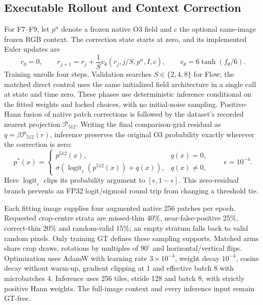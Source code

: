 \documentclass[jimaging,article,submit,pdftex,moreauthors]{Definitions/mdpi}
\begin{document}
\subsection{Executable Rollout and Context Correction}
For F7--F9, let $p^n$ denote a frozen native O3 field and $c$ the optional
same-image frozen RGB context. The correction state starts at zero, and its
implemented Euler updates are
\begin{equation}
r_0=0,\qquad
r_{j+1}=r_j+\frac{1}{S}v_\theta(r_j,j/S,p^n,I,c),\qquad
v_\theta=6\tanh\!\left(f_\theta/6\right).
\label{eq:correction-rollout}
\end{equation}
Training unrolls four steps. Validation searches $S\in\{2,4,8\}$ for Flow;
the matched direct control uses the same initialized field architecture in a
single call at state and time zero. These phases use deterministic inference
conditional on the fitted weights and locked choices, with no initial-noise
sampling. Positive-Hann fusion of native patch corrections is followed by the
dataset's recorded nearest projection $\mathcal{P}_{512}$. Writing the final
comparison-grid residual as $q=\beta\mathcal{P}_{512}(r)$, inference preserves
the original O3 probability exactly wherever the correction is zero:
\begin{equation}
p^*(x)=
\begin{cases}
p^{512}(x),&q(x)=0,\\
\sigma\!\left(\operatorname{logit}_{\epsilon}(p^{512}(x))+q(x)\right),&q(x)\ne 0,
\end{cases}
\qquad \epsilon=10^{-4}.
\label{eq:correction-output}
\end{equation}
Here $\operatorname{logit}_{\epsilon}$ clips its probability argument to
$[\epsilon,1-\epsilon]$. This zero-residual branch prevents an FP32
logit/sigmoid round trip from changing a threshold tie.

Each fitting image supplies four augmented native 256 patches per epoch.
Requested crop-centre strata are missed-thin 40\%, near-false-positive 25\%,
correct-thin 20\% and random-valid 15\%; an empty stratum falls back to valid
random pixels. Only training GT defines these sampling supports. Matched arms
share crop draws, rotations by multiples of $90^\circ$ and horizontal/vertical
flips. Optimization uses AdamW with
learning rate $3\times 10^{-4}$, weight decay $10^{-4}$, cosine decay without
warm-up, gradient clipping at 1 and effective batch 8 with microbatches 4.
Inference uses 256 tiles, stride 128 and batch 8, with strictly positive Hann
weights. The full-image context and every inference input remain GT-free.
\end{document}
